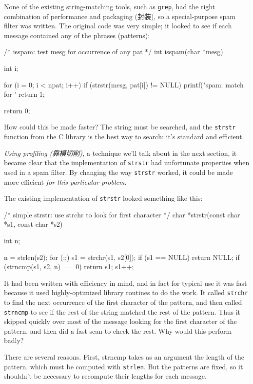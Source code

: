 None of the existing string-matching tools, such as \verb'grep', had the
right combination of performance and packaging (封装), so a special-purpose
spam filter was written. The original code was very simple; it looked to
see if each message contained any of the phrases (patterns):
\begin{wellcode}
    /* isspam: test mesg for occurrence of any pat */
    int isspam(char *mesg)
    {
        int i;

        for (i = 0; i < npat; i++)
            if (strstr(mesg, pat[i]) != NULL) {
                printf("spam: match for '%
                return 1;
            }

        return 0;
    }
\end{wellcode}
How could this be made faster? The string must be searched, and the
\verb'strstr' function from the C library is the best way to search: it's
standard and efficient.

\emph{Using profiling (靠模切削),} a technique we'll talk about in the next
section, it became clear that the implementation of \verb'strstr' had
unfortunate properties when used in a spam filter. By changing the way
\verb'strstr' worked, it could be made more efficient \emph{for this
    particular problem}.

The existing implementation of \verb'strstr' looked something like this:
\begin{wellcode}
    /* simple strstr: use strchr to look for first character */
    char *strstr(const char *s1, const char *s2)
    {
        int n;

        n = strlen(s2);
        for (;;) {
            s1 = strchr(s1, s2[0]);
            if (s1 == NULL)
                return NULL;
            if (strncmp(s1, s2, n) == 0)
                return s1;
            s1++;
        }
    }
\end{wellcode}
It had been written with efficiency in mind, and in fact for typical use it
was fast because it used highly-optimized library routines to do the work.
It called \verb'strchr' to find the next occurrence of the first character
of the pattern, and then called \verb'strncmp' to see if the rest of the
string matched the rest of the pattern. Thus it skipped quickly over most
of the message looking for the first character of the pattern.  and then
did a fast scan to check the rest. Why would this perform badly?

There are several reasons. First, strncmp takes as an argument the length
of the pattern. which must be computed with \verb'strlen'. But the patterns
are fixed, so it shouldn't be necessary to recompute their lengths for each
message.

